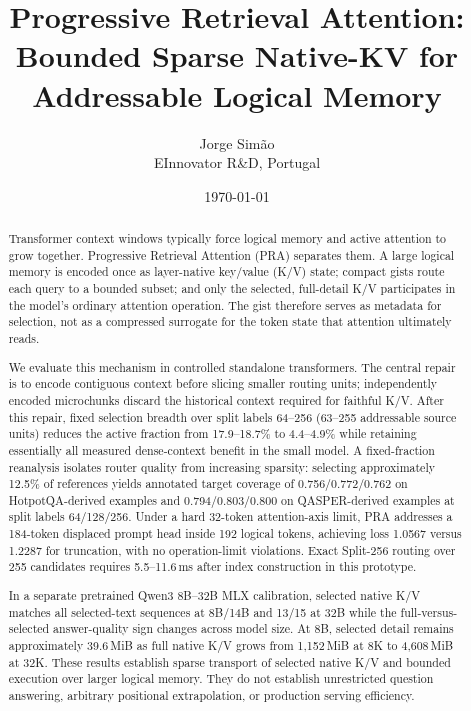 \documentclass[11pt]{article}
\title{Progressive Retrieval Attention: Bounded Sparse Native-KV for Addressable Logical
Memory}
\author{Jorge Sim\~ao\\EInnovator R\&D, Portugal}
\date{\today}
\begin{document}
\maketitle

\begin{abstract}
Transformer context windows typically force logical memory and active attention to grow
together. Progressive Retrieval Attention (PRA) separates them.
A large logical memory is encoded once as layer-native key/value (K/V) state;
compact gists route each query to a bounded subset; and only the selected,
full-detail K/V participates in the model's ordinary attention operation.
The gist therefore serves as metadata for selection,
not as a compressed surrogate for the token state that attention ultimately reads.

We evaluate this mechanism in controlled standalone transformers.
The central repair is to encode contiguous context before slicing smaller routing units;
independently encoded microchunks discard the historical context required for faithful
K/V. After this repair, fixed selection breadth over split labels 64--256 (63--255
addressable source units) reduces the active fraction from 17.9--18.7\% to 4.4--4.9\%
while retaining essentially all measured dense-context benefit in the small model.
A fixed-fraction reanalysis isolates router quality from increasing sparsity:
selecting approximately 12.5\% of references yields annotated target coverage of
0.756/0.772/0.762 on HotpotQA-derived examples and 0.794/0.803/0.800 on QASPER-derived
examples at split labels 64/128/256. Under a hard 32-token attention-axis limit,
PRA addresses a 184-token displaced prompt head inside 192 logical tokens,
achieving loss 1.0567 versus 1.2287 for truncation, with no operation-limit violations.
Exact Split-256 routing over 255 candidates requires 5.5--11.6\,ms after index
construction in this prototype.

In a separate pretrained Qwen3 8B--32B MLX calibration,
selected native K/V matches all selected-text sequences at 8B/14B and 13/15 at 32B while
the full-versus-selected answer-quality sign changes across model size. At 8B,
selected detail remains approximately 39.6\,MiB as full native K/V grows from
1{,}152\,MiB at 8K to 4{,}608\,MiB at 32K. These results establish sparse transport of
selected native K/V and bounded execution over larger logical memory.
They do not establish unrestricted question answering,
arbitrary positional extrapolation, or production serving efficiency.
\end{abstract}
\end{document}
